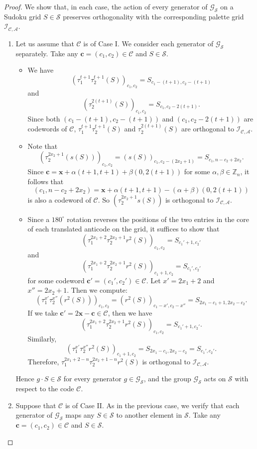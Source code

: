 \documentclass{article}
\theoremstyle{definition}
\begin{document}
\begin{proof}
We show that, in each case, the action of every generator of $\mathcal{G}_\mathcal{S}$ on a Sudoku grid $S \in \mathcal{S}$ preserves orthogonality with the corresponding palette grid $\mathcal{I}_{\mathcal{C}, \mathcal{A}}$.
\begin{enumerate}
\item[(i)] Let us assume that $\mathcal{C}$ is of Case I. We consider each generator of $\mathcal{G}_\mathcal{S}$ separately. Take any $\mathbf{c}=(c_1, c_2)\in\mathcal{C}$ and $S\in\mathcal{S}$.
	\begin{itemize}
	\item[(1)] We have
		\[
		(\tau_1^{t+1}\tau_2^{t+1}(S))_{c_1, c_2}=S_{c_1-(t+1), c_2-(t+1)}
		\]
		and
		\[
		(\tau_2^{2(t+1)}(S))_{c_1, c_2}=S_{c_1, c_2-2(t+1)}.
		\]
		Since both $(c_1-(t+1), c_2-(t+1))$ and $(c_1, c_2-2(t+1))$ are codewords of $\mathcal{C}$, $\tau_1^{t+1}\tau_2^{t+1}(S)$ and $\tau_2^{2(t+1)}(S)$ are orthogonal to $\mathcal{I}_{\mathcal{C}, \mathcal{A}}$.
	\item[(2)] Note that
		\[
		(\tau_2^{2x_2+1}(s(S)))_{c_1, c_2}=(s(S))_{c_1, c_2-(2x_2+1)}=S_{c_1, n-c_2+2x_2}.
		\]
		Since $\mathbf{c}=\mathbf{x}+\alpha(t+1, t+1)+\beta(0, 2(t+1))$ for some $\alpha, \beta\in\mathbb{Z}_n$, it follows that
		\[
		(c_1, n-c_2+2x_2)=\mathbf{x}+\alpha(t+1, t+1)-(\alpha+\beta)(0, 2(t+1))
		\]
		is also a codeword of $\mathcal{C}$. So $(\tau_2^{2x_2+1}s(S))$ is orthogonal to $\mathcal{I}_{\mathcal{C}, \mathcal{A}}$.
	\item[(3)] Since a $180^\circ$ rotation reverses the positions of the two entries in the core of each translated anticode on the grid, it suffices to show that
		\[
		(\tau_1^{2x_1+2}\tau_2^{2x_2+1} r^2(S))_{c_1, c_2} = S_{c_1'+1, c_2'}
		\]
		and
		\[
		(\tau_1^{2x_1+2}\tau_2^{2x_2+1} r^2(S))_{c_1+1, c_2} = S_{c_1', c_2'}
		\]
		for some codeword $\mathbf{c}' = (c_1', c_2') \in \mathcal{C}$. Let $x'=2x_1+2$ and $x''=2x_2+1$. Then we compute:
		\[
			(\tau_1^{x'}\tau_2^{x''} (r^2(S)))_{c_1, c_2}=(r^2(S))_{c_1-x', c_2-x''}=S_{2x_1-c_1+1, 2x_2-c_2}.
		\]
		If we take $\mathbf{c}'=2\mathbf{x}-\mathbf{c}\in\mathcal{C}$, then we have
		\[
		(\tau_1^{2x_1+2}\tau_2^{2x_2+1} r^2(S))_{c_1, c_2} = S_{c_1'+1, c_2'}.
		\]
		Similarly,
		\[
			(\tau_1^{x'}\tau_2^{x''} r^2(S))_{c_1+1, c_2}=S_{2x_1-c_1, 2x_2-c_2}=S_{c_1', c_2'}.
		\]
		Therefore, $\tau_1^{2x_1+2-n} \tau_2^{2x_2+1-n} r^2(S)$ is orthogonal to $\mathcal{I}_{\mathcal{C}, \mathcal{A}}$.
	\end{itemize}
	Hence $g \cdot S \in \mathcal{S}$ for every generator $g \in \mathcal{G}_\mathcal{S}$, and the group $\mathcal{G}_\mathcal{S}$ acts on $\mathcal{S}$ with respect to the code $\mathcal{C}$.
\item[(ii)] Suppose that $\mathcal{C}$ is of Case II. As in the previous case, we verify that each generator of $\mathcal{G}_\mathcal{S}$ maps any $S \in \mathcal{S}$ to another element in $\mathcal{S}$. Take any $\mathbf{c} = (c_1, c_2) \in \mathcal{C}$ and $S \in \mathcal{S}$.


\end{enumerate}
\end{proof}
\end{document}
